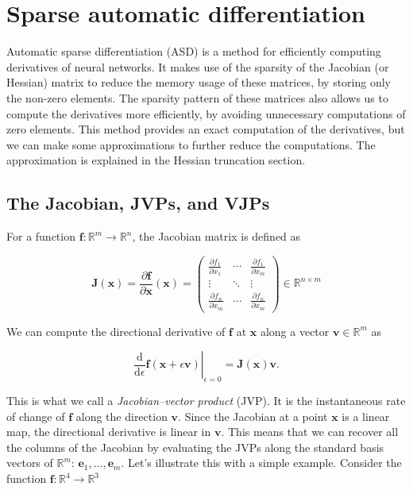 \documentclass[12pt,a4paper]{article}
\numberwithin{equation}{section}
\begin{document}
\section{Sparse automatic differentiation}
\label{sec:sparse-automatic-differentiation}

Automatic sparse differentiation (ASD) is a method for efficiently computing derivatives of neural networks.
It makes use of the sparsity of the Jacobian (or Hessian) matrix to reduce the memory usage of these matrices, by storing only the non-zero elements.
The sparsity pattern of these matrices also allows us to compute the derivatives more efficiently, by avoiding unnecessary computations of zero elements.
This method provides an exact computation of the derivatives, but we can make some approximations to further reduce the computations.
The approximation is explained in the Hessian truncation section.

\subsection{The Jacobian, JVPs, and VJPs}

For a function $\bm f:\mathbb R^m\to\mathbb R^n$, the Jacobian matrix is defined as

\begin{equation}
  \bm J(\bm x)=\frac{\partial\bm f}{\partial\bm x}(\bm x)
  =\begin{pmatrix}
    \frac{\partial f_1}{\partial x_1}&\cdots&\frac{\partial f_1}{\partial x_m}\\
    \vdots&\ddots&\vdots\\
    \frac{\partial f_n}{\partial x_m}&\cdots&\frac{\partial f_n}{\partial x_m}
  \end{pmatrix}
  \in\mathbb R^{n\times m}
  \label{eq:asd-jacobian-definition}
\end{equation}

We can compute the directional derivative of $\bm f$ at $\bm x$ along a vector $\bm v\in\mathbb R^m$ as

\begin{equation}
  \left.\frac{\mathrm d}{\mathrm d\epsilon}\bm f(\bm x+\epsilon\bm v)\right|_{\epsilon=0}
  =\bm J(\bm x)\bm v.
  \label{eq:asd-directional-derivative}
\end{equation}

This is what we call a \emph{Jacobian--vector product} (JVP). It is the instantaneous rate of change of $\bm f$ along the direction $\bm v$.
Since the Jacobian at a point $\bm x$ is a linear map, the directional derivative is linear in $\bm v$.
This means that we can recover all the columns of the Jacobian by evaluating the JVPs
along the standard basis vectors of $\mathbb R^m$: ${\bm e_1,\ldots,\bm e_m}$.
Let's illustrate this with a simple example. Consider the function $\bm f: \mathbb{R}^4 \to \mathbb{R}^3$
\end{document}

